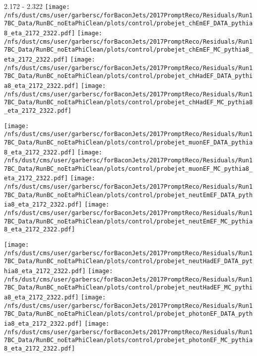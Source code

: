 \documentclass[t,compress]{beamer}
\begin{document}
\begin{frame}{2.172 - 2.322}
	\texttt{[image: /nfs/dust/cms/user/garbersc/forBaconJets/2017PromptReco/Residuals/Run17BC\_Data/RunBC\_noEtaPhiClean/plots/control/probejet\_chEmEF\_DATA\_pythia8\_eta\_2172\_2322.pdf]}
	\texttt{[image: /nfs/dust/cms/user/garbersc/forBaconJets/2017PromptReco/Residuals/Run17BC\_Data/RunBC\_noEtaPhiClean/plots/control/probejet\_chEmEF\_MC\_pythia8\_eta\_2172\_2322.pdf]}
	\texttt{[image: /nfs/dust/cms/user/garbersc/forBaconJets/2017PromptReco/Residuals/Run17BC\_Data/RunBC\_noEtaPhiClean/plots/control/probejet\_chHadEF\_DATA\_pythia8\_eta\_2172\_2322.pdf]}
	\texttt{[image: /nfs/dust/cms/user/garbersc/forBaconJets/2017PromptReco/Residuals/Run17BC\_Data/RunBC\_noEtaPhiClean/plots/control/probejet\_chHadEF\_MC\_pythia8\_eta\_2172\_2322.pdf]}
\newline

\vspace{-0.65cm}
	\texttt{[image: /nfs/dust/cms/user/garbersc/forBaconJets/2017PromptReco/Residuals/Run17BC\_Data/RunBC\_noEtaPhiClean/plots/control/probejet\_muonEF\_DATA\_pythia8\_eta\_2172\_2322.pdf]}
	\texttt{[image: /nfs/dust/cms/user/garbersc/forBaconJets/2017PromptReco/Residuals/Run17BC\_Data/RunBC\_noEtaPhiClean/plots/control/probejet\_muonEF\_MC\_pythia8\_eta\_2172\_2322.pdf]}
	\texttt{[image: /nfs/dust/cms/user/garbersc/forBaconJets/2017PromptReco/Residuals/Run17BC\_Data/RunBC\_noEtaPhiClean/plots/control/probejet\_neutEmEF\_DATA\_pythia8\_eta\_2172\_2322.pdf]}
	\texttt{[image: /nfs/dust/cms/user/garbersc/forBaconJets/2017PromptReco/Residuals/Run17BC\_Data/RunBC\_noEtaPhiClean/plots/control/probejet\_neutEmEF\_MC\_pythia8\_eta\_2172\_2322.pdf]}
\newline

\vspace{-0.65cm}
	\texttt{[image: /nfs/dust/cms/user/garbersc/forBaconJets/2017PromptReco/Residuals/Run17BC\_Data/RunBC\_noEtaPhiClean/plots/control/probejet\_neutHadEF\_DATA\_pythia8\_eta\_2172\_2322.pdf]}
	\texttt{[image: /nfs/dust/cms/user/garbersc/forBaconJets/2017PromptReco/Residuals/Run17BC\_Data/RunBC\_noEtaPhiClean/plots/control/probejet\_neutHadEF\_MC\_pythia8\_eta\_2172\_2322.pdf]}
	\texttt{[image: /nfs/dust/cms/user/garbersc/forBaconJets/2017PromptReco/Residuals/Run17BC\_Data/RunBC\_noEtaPhiClean/plots/control/probejet\_photonEF\_DATA\_pythia8\_eta\_2172\_2322.pdf]}
	\texttt{[image: /nfs/dust/cms/user/garbersc/forBaconJets/2017PromptReco/Residuals/Run17BC\_Data/RunBC\_noEtaPhiClean/plots/control/probejet\_photonEF\_MC\_pythia8\_eta\_2172\_2322.pdf]}
\end{frame}
\end{document}
